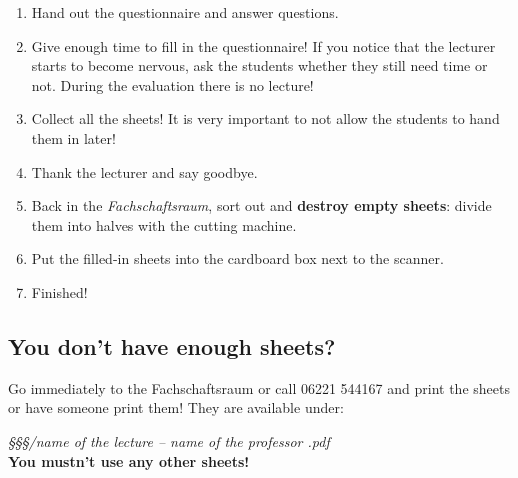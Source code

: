 \documentclass[a4paper,10pt]{article}
\begin{document}
\begin{enumerate}
\begin{itemize}
    \end{itemize}
\item Hand out the questionnaire and answer questions.
\item Give enough time to fill in the questionnaire! If you notice that the lecturer starts to become nervous, ask the students whether they still need time or not. During the evaluation there is no lecture!
\item Collect all the sheets! It is very important to not allow the students to hand them in later!
\item Thank the lecturer and say goodbye.
\item Back in the \textit{Fachschaftsraum}, sort out and \textbf{destroy empty sheets}: divide them into halves with the cutting machine.
\item Put the filled-in sheets into the cardboard box next to the scanner.
\item Finished!
\end{enumerate}

\subsection*{You don’t have enough sheets?}
Go immediately to the Fachschaftsraum or call 06221 544167 and print the sheets or have someone print them!
They are available under:

\textit{§§§/\glqq name of the lecture -- name of the professor\grqq
  .pdf}\\ \textbf{You mustn’t use any other sheets!}
\end{document}
